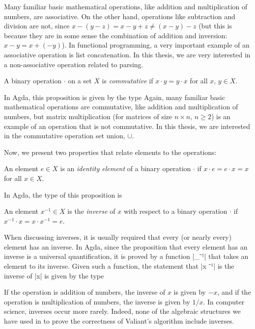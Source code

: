 Many familiar basic mathematical operations, like addition and multiplication of numbers, are associative. On the other hand, operations like subtraction and division are not, since $x - (y - z) = x - y + z \ne (x - y) - z$ (but this is because they are in some sense the combination of addition and inversion: $x - y = x + (-y)$). In functional programming, a very important example of an associative operation is list concatenation.
In this thesis, we are very interested in a non-associative operation related to parsing. %



\begin{Definition} %
A binary operation $\cdot$ on a set $X$ is \emph{commutative} if $x \cdot y = y \cdot x$ for all $x$, $y \in X$.
\end{Definition}
In Agda, this proposition is given by the type
Again, many familiar basic mathematical operations are commutative, like addition and multiplication of numbers, but matrix multiplication (for matrices of size $n \times n$, $n \ge 2$) is an example of an operation that is not commutative.
In this thesis, we are interested in the commutative operation set union, $\cup$.

Now, we present two properties that relate elements to the operations:
\begin{Definition} %
  An element $e \in X$ is an \emph{identity element} of a binary operation $\cdot$ if $x \cdot e = e \cdot x = x$ for all $x \in X$.
\end{Definition}
In Agda, the type of this proposition is


\begin{Definition}
An element $x^{-1} \in X$ is the \emph{inverse} of $x$ with respect to a binary operation $\cdot$ if $x^{-1} \cdot x = x \cdot x^{-1} = e$.
\end{Definition}
When discussing inverses, it is usually required that every (or nearly every) element has an inverse.
In Agda, since the proposition that every element has an inverse is a universal quantification, it is proved by a function |_⁻¹| that takes an element to its inverse. Given such a function, the statement that |x ⁻¹| is the inverse of |x| is given by the type

If the operation is addition of numbers, the inverse of $x$ is given by $-x$, and if the operation is multiplication of numbers, the inverse is given by $1/x$. In computer science, inverses occur more rarely.
Indeed, none of the algebraic structures we have used in to prove the correctness of Valiant's algorithm include inverses.

